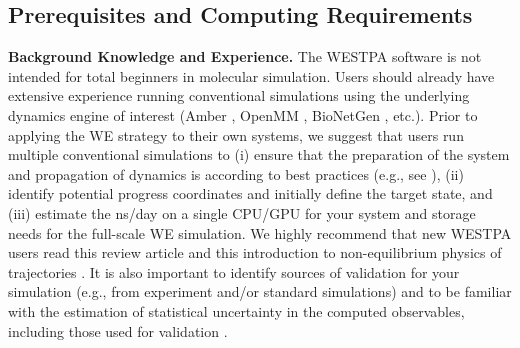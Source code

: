 \subsection{Prerequisites and Computing Requirements}
\label{intro:prereq}

\textbf{Background Knowledge and Experience.} 
The WESTPA software is not intended for total beginners in molecular simulation. 
Users should already have extensive experience running conventional simulations using the underlying dynamics engine of interest (Amber \citep{case_amber_2022}, OpenMM \citep{eastman_openmm_2017}, BioNetGen \citep{harris_bionetgen_2016}, etc.). 
Prior to applying the WE strategy to their own systems, we suggest that users run multiple conventional simulations to (i) ensure that the preparation of the system and propagation of dynamics is according to best practices (e.g., see \citep{braun_best_2019}), (ii) identify potential progress coordinates and initially define the target state, and (iii) estimate the ns/day on a single CPU/GPU for your system and storage needs for the full-scale WE simulation. 
We highly recommend that new WESTPA users read this review article \citep{zuckerman_weighted_2017} and this introduction to non-equilibrium physics of trajectories \citep{zuckerman_gentle_2021}. 
It is also important to identify sources of validation for your simulation (e.g., from experiment and/or standard simulations) and to be familiar with the estimation of statistical uncertainty in the computed observables, including those used for validation \citep{Grossfield2019}. 
\begin{comment}
\subsubsection{Software Requirements}

The WESTPA software requires Python and a number of standard Python scientific computing packages. 
All required software is available through the Anaconda Python distribution, which also provides the preferred mechanism for obtaining and installing WESTPA itself. 
The software can be used on any Unix operating system, including academic clusters and supercomputers. 
The installation of WESTPA is streamlined by an Anaconda conda install recipe that enables WESTPA and all software dependencies to be installed at the same time.

In addition, WESTPA will require interfacing with an external dynamics engine in order to run WE simulations.  Examples of dynamics engines that can be used (all free of charge), and the versions used are included before each tutorial in this manuscript.
\end{comment}


